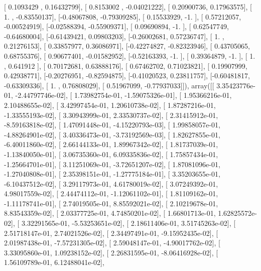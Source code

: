 \documentclass{article}
\begin{document}
       [ 0.1093429 ,  0.16432799],
       [ 0.8153002 , -0.04021222],
       [ 0.20900736,  0.17963575],
       [ 1.        , -0.83550137],
       [-0.48067808, -0.79309285],
       [ 0.15533929, -1.        ],
       [ 0.57212057, -0.00524919],
       [-0.02588394, -0.55909371],
       [ 0.09690894, -1.        ],
       [ 0.62547749, -0.64680004],
       [-0.61439421,  0.09803203],
       [-0.26002681,  0.57236747],
       [ 1.        ,  0.21276153],
       [ 0.33857977,  0.36086971],
       [-0.42274827, -0.82323946],
       [ 0.43705065,  0.68755376],
       [ 0.90677401, -0.01582952],
       [-0.52163393, -1.        ],
       [ 0.39364879, -1.        ],
       [ 1.        ,  0.641912  ],
       [ 0.70172681,  0.63888176],
       [ 0.67462702,  0.71023821],
       [ 0.19907999,  0.42938771],
       [-0.20276951, -0.82594875],
       [-0.41020523,  0.23811757],
       [-0.60481817, -0.63309336],
       [ 1.        ,  0.76808029],
       [ 0.51967099, -0.77937033]]), array([[  3.35423776e-01,  -2.44797746e-02],
       [  1.73982754e-01,  -1.59075326e-01],
       [  1.95366216e-01,   2.10488655e-02],
       [  3.42997454e-01,   1.20610738e-02],
       [  1.87287216e-01,  -1.33555193e-02],
       [  3.30943999e-01,   2.33530737e-02],
       [  2.31415912e-01,  -8.59163818e-02],
       [  1.47091448e-01,  -4.15220793e-03],
       [  1.99858057e-01,  -4.88264901e-02],
       [  3.40336473e-01,  -3.73192569e-03],
       [  1.82627855e-01,  -6.40011860e-02],
       [  2.66144133e-01,   1.89967342e-02],
       [  1.81737039e-01,  -1.13840050e-01],
       [  3.06735360e-01,   6.09335836e-02],
       [  1.75857434e-01,  -1.25664701e-01],
       [  3.11251069e-01,  -3.72651207e-02],
       [  1.87081096e-01,  -1.27040808e-01],
       [  2.35398151e-01,  -1.27775184e-01],
       [  3.35203655e-01,  -6.10437512e-02],
       [  3.29117973e-01,   4.61780019e-02],
       [  3.07249392e-01,   4.98017559e-02],
       [  2.44474112e-01,  -1.12061102e-01],
       [  1.81109162e-01,  -1.11178741e-01],
       [  2.74019505e-01,   8.85592021e-02],
       [  2.10219678e-01,   8.83543359e-02],
       [  2.03377725e-01,   4.74850201e-02],
       [  1.66801713e-01,   1.62825572e-02],
       [  3.32291565e-01,  -5.53253651e-02],
       [  2.18611406e-01,   3.51745263e-02],
       [  2.51718147e-01,   2.74021526e-02],
       [  2.34497491e-01,  -9.15952435e-02],
       [  2.01987438e-01,  -7.57231305e-02],
       [  2.59048147e-01,  -4.90017762e-02],
       [  3.33095860e-01,   1.09238152e-02],
       [  2.26831595e-01,  -8.06416928e-02],
       [  1.56109789e-01,   6.12488041e-02],
\end{document}
